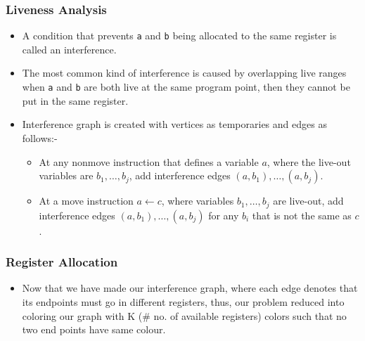 \documentclass{beamer}
\begin{document}
\begin{frame}[fragile]
  \frametitle{Liveness Analysis}
  \begin{itemize}
    \item A condition that prevents \texttt{a} and \texttt{b} being allocated to the same register is called an interference.
    
    \item The most common kind of interference is caused by overlapping live ranges when \texttt{a} and \texttt{b} are both live at the same program point, then they cannot be put in the same register.

    \item Interference graph is created with vertices as temporaries and edges as follows:-
    \begin{itemize}
      \item At any nonmove instruction that defines a variable $a$, where the live-out variables are $b_1, …, b_j$, add interference edges $(a, b_1), …,(a, b_j)$.
      \item At a move instruction $a \leftarrow c$, where variables $b_1, …, b_j$ are live-out, add interference edges $(a, b_1), …, (a, b_j)$ for any $b_i$ that is not the same as $c$.
    \end{itemize}
  \end{itemize}
\end{frame}

\begin{frame}[fragile]
  \frametitle{Register Allocation}
  \begin{itemize}
    \item Now that we have made our interference graph, where each edge denotes that its endpoints must go in different registers, thus, our problem reduced into coloring our graph with K (\# no. of available registers) colors such that no two end points have same colour.
  \end{itemize}
\end{frame}
\end{document}
